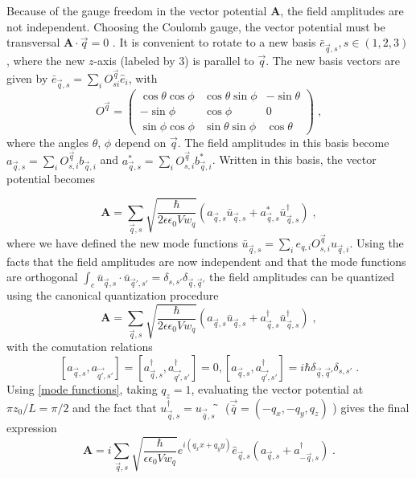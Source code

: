 \documentclass{article}
\begin{document}
Because of the gauge freedom in the vector potential  $\textbf{A}$, the field amplitudes are not independent.  Choosing the Coulomb gauge, the vector potential must be transversal $\textbf{A} \cdot \vec{q} = 0$ . It is convenient to rotate to a new basis $\bar{e}_{\vec{q}, s}, s \in (1,2,3)$, where the new $z$-axis (labeled by $3$) is parallel to $\vec{q}$. The new basis vectors are given by $\bar{e}_{\vec{q}, s} = \sum_i O^{\vec{q}}_{si} \hat{e}_i $, with
\begin{equation}
    O^{\vec{q}} = \begin{pmatrix} 
    \cos{\theta}\cos{\phi} & \cos{\theta}\sin{\phi} & - \sin{\theta} \\ 
    -\sin{\phi}            & \cos{\phi}             & 0 \\
    \sin{\phi}\cos{\phi}   & \sin{\theta}\sin{\phi} & \cos{\theta}
    \end{pmatrix}\;,
\end{equation}
where the angles $\theta$, $\phi$ depend on $\vec{q}$. The field amplitudes in this basis become $a_{\vec{q},s} = \sum_i O^{\vec{q}}_{s,i} b_{\vec{q}, i}$ and $a_{\vec{q},s}^{*} = \sum_i O^{\vec{q}}_{s,i} b_{\vec{q}, i}^{*}$. Written in this basis, the vector potential becomes

\begin{equation}
\textbf{A} = \sum_{\vec{q}, s} \sqrt{\frac{\hbar}{2 \epsilon \epsilon_0 V w_q}} \left(a_{\vec{q},s} \bar{u}_{\vec{q},s} + a_{\vec{q},s}^{*} \bar{u}_{\vec{q},s}^{\dagger}\right)\;,
\end{equation}
where we have defined the new mode functions $\bar{u}_{\vec{q},s} = \sum_i e_{q,i} O^{\vec{q}}_{s,i} u_{\vec{q}, i}$. Using the facts that the field amplitudes are now independent and that the mode functions are orthogonal $\int_c \bar{u}_{\vec{q},s} \cdot \bar{u}_{\vec{q}',s'} = \delta_{s,s'}\delta_{\vec{q},\vec{q}'} $ the field amplitudes can be quantized using the canonical quantization procedure~\cite{Altland}
\begin{equation}
\textbf{A} = \sum_{\vec{q}, s} \sqrt{\frac{\hbar}{2 \epsilon \epsilon_0 V w_q}} \left(a_{\vec{q},s} \bar{u}_{\vec{q},s} + a_{\vec{q},s}^{\dagger} \bar{u}_{\vec{q},s}^{\dagger}\right)\;, 
\end{equation}
with the comutation relations
\begin{equation}
    \left[a_{\vec{q},s}, a_{\vec{q'},s'}\right] = \left[a_{\vec{q},s}^{\dagger}, a_{\vec{q'},s'}^{\dagger}\right] = 0, \left[a_{\vec{q},s}, a_{\vec{q'},s'}^{\dagger}\right] = i \hbar \delta_{\vec{q}, \vec{q}'} \delta_{s,s'}\;.
\end{equation}
Using \cref{mode functions}, taking $q_z = 1$, evaluating the vector potential at $\pi z_0 / L = \pi / 2$ and the fact that $u_{\vec{q},s}^{\dagger} = u_{\vec{\bar{q}},s}̃$ ($\vec{\bar{q}} = (-q_x, -q_y, q_z)$ ) gives the final expression 
\begin{equation}
    \textbf{A} = i \sum_{\vec{q},s} \sqrt{\frac{\hbar}{\epsilon \epsilon_0 V w_q}} e^{i(q_x x + q_y y )} \hat{e}_{\vec{q},s}\left(a_{\vec{q},s} + a_{-\vec{q}, s}^{\dagger}\right) \;.
    \label{vector potential cavity}
\end{equation}
\end{document}
